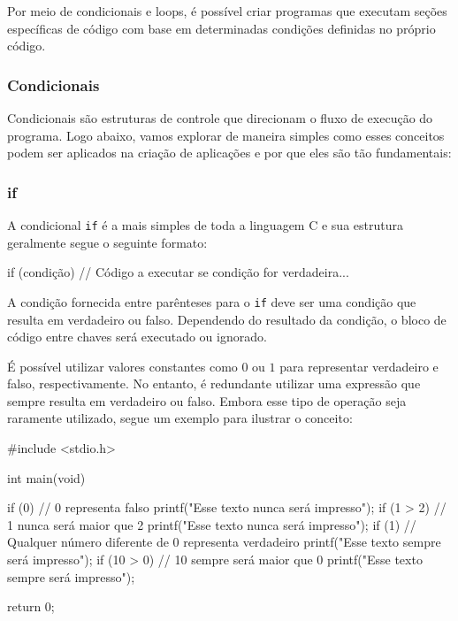 Por meio de condicionais e loops, é possível criar programas que executam 
seções específicas de código com base em determinadas condições definidas 
no próprio código.

\subsubsection{Condicionais}

Condicionais são estruturas de controle que direcionam o fluxo de execução 
do programa. Logo abaixo, vamos explorar de maneira simples como esses 
conceitos podem ser aplicados na criação de aplicações e por que eles são tão 
fundamentais:

\subsubsection{if}

A condicional \texttt{if} é a mais simples de toda a linguagem C e sua estrutura 
geralmente segue o seguinte formato:

\begin{excode}
    if (condição) {
        // Código a executar se condição for verdadeira...
    }
\end{excode}

A condição fornecida entre parênteses para o \texttt{if} deve ser uma 
condição que resulta em verdadeiro ou falso. Dependendo do resultado da 
condição, o bloco de código entre chaves será executado ou ignorado.

É possível utilizar valores constantes como \(0\) ou \(1\) para representar 
verdadeiro e falso, respectivamente. No entanto, é redundante utilizar uma expressão 
que sempre resulta em verdadeiro ou falso. Embora esse tipo de operação seja raramente 
utilizado, segue um exemplo para ilustrar o conceito:

\begin{excode}
    #include <stdio.h>

    int main(void)
    {
        if (0) { // 0 representa falso
            printf("Esse texto nunca será impresso\n");
        }
        if (1 > 2) { // 1 nunca será maior que 2
            printf("Esse texto nunca será impresso\n");
        }
        if (1) { // Qualquer número diferente de 0 representa verdadeiro
            printf("Esse texto sempre será impresso\n");
        }
        if (10 > 0) { // 10 sempre será maior que 0
            printf("Esse texto sempre será impresso\n");
        }
        
        return 0;
    }
\end{excode}

